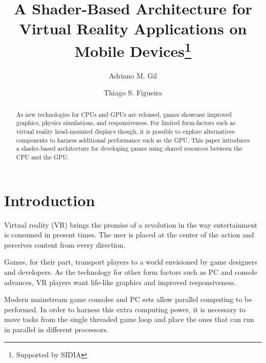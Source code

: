 \documentclass[runningheads]{llncs}
\begin{document}
%
\title{A Shader-Based Architecture for Virtual Reality Applications on Mobile Devices\thanks{Supported by SIDIA}}
%
%
\author{Adriano M. Gil \and Thiago S. Figueira}
%
%
%
\maketitle              %
%
\begin{abstract}
As new technologies for CPUs and GPUs are released, games showcase improved graphics, physics simulations, and responsiveness. For limited form-factors such as virtual reality head-mounted displays though, it is possible  to explore alternatives components to harness additional performance such as the GPU. This paper introduces a shader-based architecture for developing games using shared resources between the CPU and the GPU.

\end{abstract}
%
%
%
\section{Introduction}

Virtual reality (VR) brings the promise of a revolution in the way entertainment is consumed in present times. The user is placed at the center of the action and perceives content from every direction.

Games, for their part, transport players to a world envisioned by game designers and developers. As the technology for other form factors such as PC and console advances, VR players want life-like graphics and improved responsiveness.

Modern mainstream game consoles and PC sets allow parallel computing to be performed. In order to harness this extra computing power, it is necessary to move tasks from the single threaded game loop and place the ones that can run in parallel in different processors.  
\end{document}
